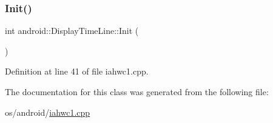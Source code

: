 \subsubsection{\texorpdfstring{Init()}{Init()}}
{\footnotesize\ttfamily int android\+::\+Display\+Time\+Line\+::\+Init (\begin{DoxyParamCaption}{ }\end{DoxyParamCaption})\hspace{0.3cm}{\ttfamily [inline]}}



Definition at line 41 of file iahwc1.\+cpp.


\begin{DoxyCode}{0}
\end{DoxyCode}


The documentation for this class was generated from the following file\+:\begin{DoxyCompactItemize}
\item 
os/android/\mbox{\hyperlink{iahwc1_8cpp}{iahwc1.\+cpp}}\end{DoxyCompactItemize}
